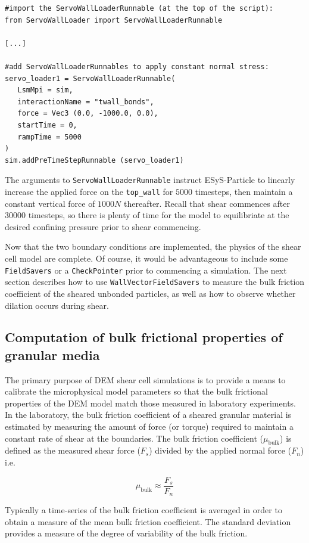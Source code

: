 \begin{verbatim}
#import the ServoWallLoaderRunnable (at the top of the script):
from ServoWallLoader import ServoWallLoaderRunnable

[...]

#add ServoWallLoaderRunnables to apply constant normal stress:
servo_loader1 = ServoWallLoaderRunnable(
   LsmMpi = sim,
   interactionName = "twall_bonds",	
   force = Vec3 (0.0, -1000.0, 0.0),
   startTime = 0,
   rampTime = 5000
)
sim.addPreTimeStepRunnable (servo_loader1)
\end{verbatim}

\noindent
The arguments to \texttt{ServoWallLoaderRunnable} instruct ESyS-Particle to linearly increase the applied force on the \texttt{top\_wall} for $5000$ timesteps, then maintain a constant vertical force of $1000N$ thereafter. Recall that shear commences after $30000$ timesteps, so there is plenty of time for the model to equilibriate at the desired confining pressure prior to shear commencing.

Now that the two boundary conditions are implemented, the physics of the shear cell model are complete. Of course, it would be advantageous to include some \texttt{FieldSavers} or a \texttt{CheckPointer} prior to commencing a simulation. The next section describes how to use \texttt{WallVectorFieldSavers} to measure the bulk friction coefficient of the sheared unbonded particles, as well as how to observe whether dilation occurs during shear.

\subsection{Computation of bulk frictional properties of granular media}

The primary purpose of DEM shear cell simulations is to provide a means to calibrate the microphysical model parameters so that the bulk frictional properties of the DEM model match those measured in laboratory experiments. In the laboratory, the bulk friction coefficient of a sheared granular material is estimated by measuring the amount of force (or torque) required to maintain a constant rate of shear at the boundaries. The bulk friction coefficient ($\mu_{\mathrm{bulk}}$) is defined as the measured shear force ($F_s$) divided by the applied normal force ($F_n$) i.e.

\[ \mu_{\mathrm{bulk}} \approx \frac{F_s}{F_n} \]

\noindent
Typically a time-series of the bulk friction coefficient is averaged in order to obtain a measure of the mean bulk friction coefficient. The standard deviation provides a measure of the degree of variability of the bulk friction. 

